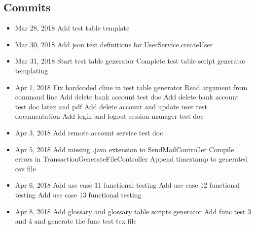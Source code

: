 \documentclass[12pt]{article}
\begin{document}
\subsection{Commits}
\begin{itemize}
    \item Mar 28, 2018
        \subitem [DOC] Add test table template
    \item Mar 30, 2018
        \subitem [DOC] Add json test definitions for UserService.createUser
    \item Mar 31, 2018
        \subitem  [FEAT] Start test table generator
        \subitem  [FEAT] Complete test table script generator templating
    \item Apr 1, 2018
        \subitem [FIX] Fix hardcoded cline in test table generator
        \subitem [FEAT] Read argument from command line
        \subitem [DOC] Add delete bank account test doc
        \subitem [DOC] Add delete bank account test doc latex and pdf
        \subitem [DOC] Add delete account and update user test documentation
        \subitem [DOC] Add login and logout session manager test doc
    \item Apr 3, 2018
        \subitem [DOC] Add remote account service test doc
    \item Apr 5, 2018
        \subitem [FIX] Add missing .java extension to SendMailController
        \subitem [FIX] Compile errors in TransactionGenerateFileController
        \subitem [REFACTOR] Append timestamp to generated csv file
    \item Apr 6, 2018
        \subitem [DOC] Add use case 11 functional testing
        \subitem [DOC] Add use case 12 functional testing
        \subitem [DOC] Add use case 13 functional testing
    \item Apr 8, 2018
        \subitem [DOC] Add glossary and glossary table scripts generator
        \subitem [DOC] Add func test 3 and 4 and generate the func test tex file
\end{itemize}
\end{document}
